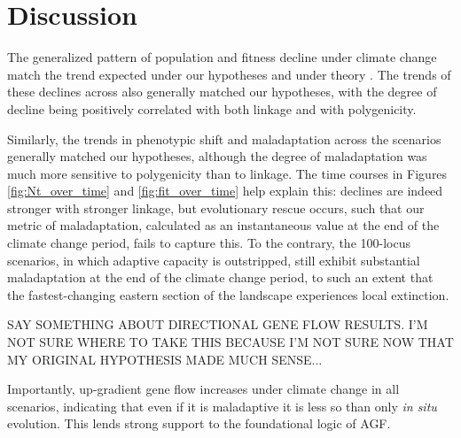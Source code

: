 \documentclass[9pt,twocolumn,twoside,lineno]{pnas-new}
\begin{document}
\section*{Discussion}

The generalized pattern of population and fitness decline under 
climate change match the
trend expected under our hypotheses and under theory 
\cite{aitken_whitlock}.
The trends of these declines across also generally matched our hypotheses,
with the degree of decline being positively correlated with both linkage and with polygenicity.

Similarly, the trends in phenotypic shift and maladaptation
across the scenarios generally matched our hypotheses,
although the degree of maladaptation was much more sensitive to
polygenicity than to linkage.
The time courses in Figures \ref{fig:Nt_over_time} and \ref{fig:fit_over_time} help explain this: declines
are indeed stronger with stronger linkage, but evolutionary
rescue occurs, such that our metric of maladaptation,
calculated as an instantaneous value 
at the end of the climate change period,
fails to capture this.
To the contrary, the 100-locus scenarios,
in which adaptive capacity is outstripped,
still exhibit substantial maladaptation at the end of the climate
change period, to such an extent that the fastest-changing
eastern section of the landscape experiences local extinction.


SAY SOMETHING ABOUT DIRECTIONAL GENE FLOW RESULTS. I'M NOT SURE WHERE TO TAKE THIS BECAUSE
I'M NOT SURE NOW THAT MY ORIGINAL HYPOTHESIS MADE MUCH SENSE...

Importantly, up-gradient gene flow increases under climate change in all scenarios,
indicating that even if it is maladaptive it is less so than only \textit{in situ} evolution.
This lends strong support to the foundational logic of AGF.
\end{document}
